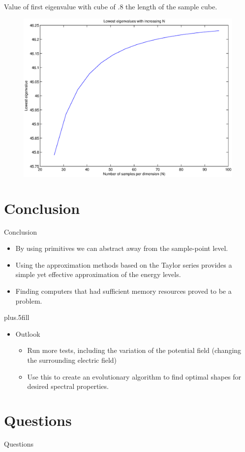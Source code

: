 \documentclass{beamer}
\begin{document}
\begin{frame}
Value of first eigenvalue with cube of $.8$ the length of the sample cube.
\begin{figure}[!h]
\centering
\includegraphics[scale=0.4]{figures/M2converge.eps}
\end{figure}
\end{frame}

\section*{Conclusion}

\begin{frame}{Conclusion}

  \begin{itemize}
  \item
   By using primitives we can abstract away from the sample-point level.
  \item
   Using the approximation methods based on the Taylor series provides a simple 
   yet effective approximation of the energy levels.
  \item
   Finding computers that had sufficient memory resources proved to be a problem.
  \end{itemize}
  
  \vskip0pt plus.5fill
  \begin{itemize}
  \item
    Outlook
    \begin{itemize}
    \item
     Run more tests, including the variation of the potential field (changing the surrounding electric field)
    \item
     Use this to create an evolutionary algorithm to find optimal shapes for desired spectral properties.
    \end{itemize}
  \end{itemize}
\end{frame}

\section*{Questions}

\begin{frame}
\centering
Questions
\end{frame}

\end{document}
